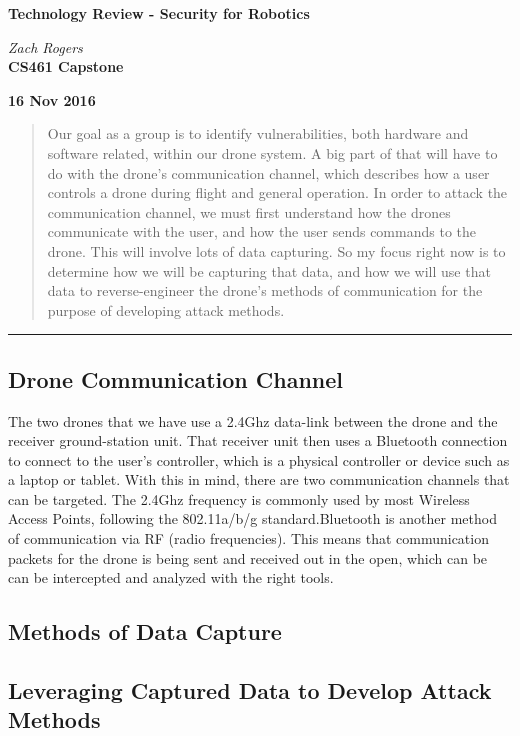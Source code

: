 \documentclass[IEEEtran,letterpaper,10pt,titlepage,draftclsnofoot,onecolumn]{article}
\begin{document}
\begin{titlepage}
  \begin{center}
    \vspace*{1cm}

    \huge
    \textbf{Technology Review - Security for Robotics}
  \vspace{0.5cm}

    \textit{Zach Rogers}\\
  \vspace{0.5cm}
    \vfill
    \large
    \textbf{CS461 Capstone}\\
  \vspace{5mm}

    \textbf{16 Nov 2016}\\

    \vfill
    \end{center}
\end{titlepage}

\begin{abstract}
Our goal as a group is to identify vulnerabilities, both hardware and software related, within our drone system.
A big part of that will have to do with the drone's communication channel, which describes how a user controls a
drone during flight and general operation. In order to attack the communication channel, we must first understand
how the drones communicate with the user, and how the user sends commands to the drone. This will involve lots of
data capturing. So my focus right now is to determine how we will be capturing that data, and how we will use that
data to reverse-engineer the drone's methods of communication for the purpose of developing attack methods.
\end{abstract}

\hrule\vspace{5mm}
\subsection*{Drone Communication Channel}
The two drones that we have use a 2.4Ghz data-link between the drone and the receiver ground-station unit.
That receiver unit then uses a Bluetooth connection to connect to the user's controller, which is a physical controller
or device such as a laptop or tablet.\cite{NazaM2} With this in mind, there are two communication channels that can be
targeted. The 2.4Ghz frequency is commonly used by most Wireless Access Points, following the 802.11a/b/g
standard.Bluetooth is another method of communication via RF (radio frequencies). This means that communication packets
for the drone is being sent and received out in the open, which can be can be intercepted and analyzed with the right
tools.

\subsection*{Methods of Data Capture}


\subsection*{Leveraging Captured Data to Develop Attack Methods}


\newpage


\end{document}
